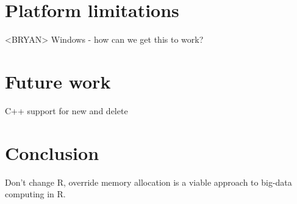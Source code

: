 \section{Platform limitations}

<BRYAN> Windows - how can we get this to work?

\section{Future work}

C++ support for new and delete

\section{Conclusion}

Don't change R, override memory allocation is a viable approach to big-data 
computing in R.


%

%

